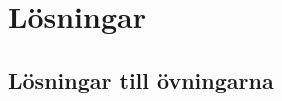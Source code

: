 \documentclass[a4paper]{compendium}
\newif\ifPreSolution  %
\let\QUESTBEGIN\ifPreSolution  %
\let\SOLUTION\else  %
\let\QUESTEND\fi    %
\begin{document}
\part{Lösningar}

\setcounter{chapter}{11} %
\renewcommand\thechapter{\Alph{chapter}}
\chapter{Lösningar till övningarna}\label{chapter:solutions}

\PreSolutionfalse

\let\QUESTBEGIN\ifPreSolution  %
\let\SOLUTION\else  %
\let\QUESTEND\fi    %










%  
%  
%
%
%
%
%
%
\end{document}

